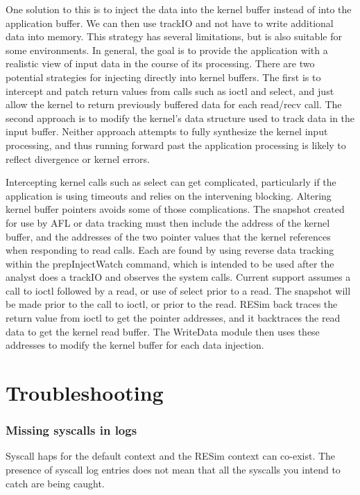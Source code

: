 \documentclass[titlepage]{article}
\begin{document}
\begin{appendices}
One solution to this is to inject the data into the kernel buffer instead of into the application buffer.
We can then use trackIO and not have to write additional data into memory.  This strategy has several limitations, but
is also suitable for some environments.  In general, the goal is to provide the application with a realistic view of
input data in the course of its processing.  There are two potential strategies for injecting directly into kernel buffers.
The first is to intercept and patch return values from calls such as ioctl and select, and just allow the kernel to 
return previously buffered data for each read/recv call.  The second approach is to modify the kernel's data structure
used to track data in the input buffer.  Neither approach attempts to fully synthesize the kernel input processing, and thus
running forward past the application processing is likely to reflect divergence or kernel errors.

Intercepting kernel calls such as select can get complicated, particularly if the application is using timeouts and relies
on the intervening blocking.  Altering kernel buffer pointers avoids some of those complications.  The snapshot created
for use by AFL or data tracking must then include the address of the kernel buffer, and the addresses of the two pointer
values that the kernel references when responding to read calls.  Each are found by using reverse data tracking within the
prepInjectWatch command, which is intended to be used after the analyst does a trackIO and observes the system calls.
Current support assumes a call to ioctl followed by a read, or use of select prior to a read.  The snapshot will be made prior to the call to ioctl, or
prior to the read.  RESim
back traces the return value from ioctl to get the pointer addresses, and it backtraces the read data to get the kernel
read buffer.  The WriteData module then uses these addresses to modify the kernel buffer for each data injection.


\section{Troubleshooting}
\subsubsection{Missing syscalls in logs}
Syscall haps for the default context and the RESim context can co-exist.  The presence of syscall log entries does not
mean that all the syscalls you intend to catch are being caught.


\end{appendices}
\end{document}
